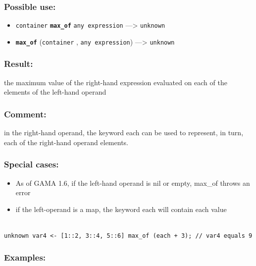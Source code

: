 \documentclass[]{book}
\providecommand{\tightlist}{%
  \setlength{\itemsep}{0pt}\setlength{\parskip}{0pt}}
\theoremstyle{definition}
\theoremstyle{definition}
\theoremstyle{definition}
\theoremstyle{remark}
\begin{document}
\subsubsection{Possible use:}\label{possible-use-341}

\begin{itemize}
\tightlist
\item
  \texttt{container} \textbf{\texttt{max\_of}} \texttt{any\ expression}
  ---\textgreater{} \texttt{unknown}
\item
  \textbf{\texttt{max\_of}} (\texttt{container} ,
  \texttt{any\ expression}) ---\textgreater{} \texttt{unknown}
\end{itemize}

\subsubsection{Result:}\label{result-330}

the maximum value of the right-hand expression evaluated on each of the
elements of the left-hand operand

\subsubsection{Comment:}\label{comment-66}

in the right-hand operand, the keyword each can be used to represent, in
turn, each of the right-hand operand elements.

\subsubsection{Special cases:}\label{special-cases-94}

\begin{itemize}
\tightlist
\item
  As of GAMA 1.6, if the left-hand operand is nil or empty, max\_of
  throws an error\\
\item
  if the left-operand is a map, the keyword each will contain each value
\end{itemize}

\begin{verbatim}
 
unknown var4 <- [1::2, 3::4, 5::6] max_of (each + 3); // var4 equals 9
\end{verbatim}

\subsubsection{Examples:}\label{examples-234}
\end{document}
